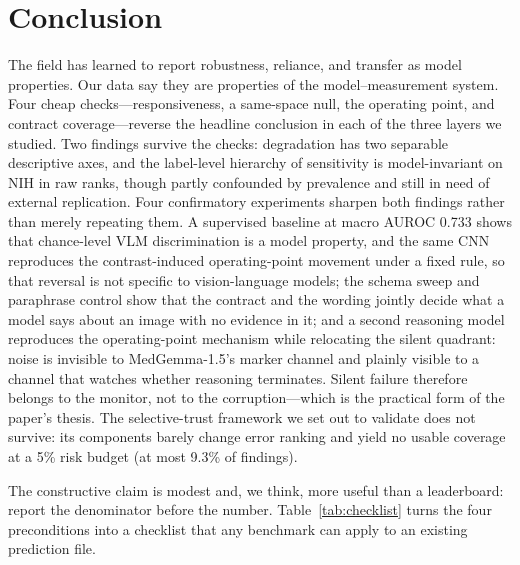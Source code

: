 \section*{Conclusion}
\label{sec:conclusion}

The field has learned to report robustness, reliance, and transfer as model properties. Our data say they are properties of the model--measurement system. Four cheap checks---responsiveness, a same-space null, the operating point, and contract coverage---reverse the headline conclusion in each of the three layers we studied. Two findings survive the checks: degradation has two separable descriptive axes, and the label-level hierarchy of sensitivity is model-invariant on NIH in raw ranks, though partly confounded by prevalence and still in need of external replication. Four confirmatory experiments sharpen both findings rather than merely repeating them. A supervised baseline at macro AUROC 0.733 shows that chance-level VLM discrimination is a model property, and the same CNN reproduces the contrast-induced operating-point movement under a fixed rule, so that reversal is not specific to vision-language models; the schema sweep and paraphrase control show that the contract and the wording jointly decide what a model says about an image with no evidence in it; and a second reasoning model reproduces the operating-point mechanism while relocating the silent quadrant: noise is invisible to MedGemma-1.5's marker channel and plainly visible to a channel that watches whether reasoning terminates. Silent failure therefore belongs to the monitor, not to the corruption---which is the practical form of the paper's thesis. The selective-trust framework we set out to validate does not survive: its components barely change error ranking and yield no usable coverage at a 5\% risk budget (at most 9.3\% of findings).

The constructive claim is modest and, we think, more useful than a leaderboard: report the denominator before the number. Table~\ref{tab:checklist} turns the four preconditions into a checklist that any benchmark can apply to an existing prediction file.

